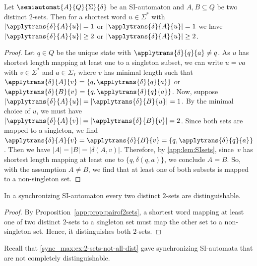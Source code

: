 \begin{proposition}
\label{app:prop:pairof2sets}
	Let $\semiautomat{A}{Q}{\Sigma}{\delta}$ be an SI-automaton
	and $A, B \subseteq Q$ be two distinct $2$-sets.
	Then for a shortest word $u \in \Sigma^*$
	with $|\applytrans{\delta}{A}{u}| = 1$
	or $|\applytrans{\delta}{A}{u}| = 1$
	we have $|\applytrans{\delta}{A}{u}| \ge 2$
	or $|\applytrans{\delta}{A}{u}| \ge 2$.	
\end{proposition} 
\begin{proof}
	Let $q \in Q$ be the unique state with $\applytrans{\delta}{q}{a}\ne q$.
	As $u$ has shortest length mapping at least one to a singleton
	subset, we can write $u = va$ with $v \in \Sigma^*$
	and $a \in \Sigma_I$
	where $v$ has minimal length such that
	$\applytrans{\delta}{A}{v} = \{q, \applytrans{\delta}{q}{a}\}$
	or $\applytrans{\delta}{B}{v} = \{q, \applytrans{\delta}{q}{a}\}$.	
	Now, suppose $|\applytrans{\delta}{A}{u}| = |\applytrans{\delta}{B}{u}| = 1$.
	By the minimal choice of $u$,
	we must have $|\applytrans{\delta}{A}{v}| = |\applytrans{\delta}{B}{v}| = 2$.
	Since both sets are mapped to a singleton, we find
	$\applytrans{\delta}{A}{v} = \applytrans{\delta}{B}{v} = \{q, \applytrans{\delta}{q}{a}\}$.
	Then we have $|A| = |B| = |\delta(A, v)|$.
	Therefore, by \cref{app:lem:SIsets}, since~$v$ has shortest length mapping
	at least one to $\{q, \delta(q, a)\}$, we conclude $A = B$.	
	So, with the assumption $A \ne B$,
	we find that at least one of 
	both subsets is mapped to a non-singleton set.
\end{proof}

\begin{corollary}\label{syncmax:cor:SI-2-sets}
	In a synchronizing SI-automaton every two distinct $2$-sets
	are distinguishable.
\end{corollary}
\begin{proof}
 By Proposition~\ref{app:prop:pairof2sets}, a shortest
 word mapping at least one of two distinct $2$-sets
 to a singleton set must map the other set to a non-singleton
 set. Hence, it distinguishes both $2$-sets.
\end{proof}

Recall that \cref{sync_max:ex:2-sets-not-all-dist} gave synchronizing SI-automata
that are not completely distinguishable.